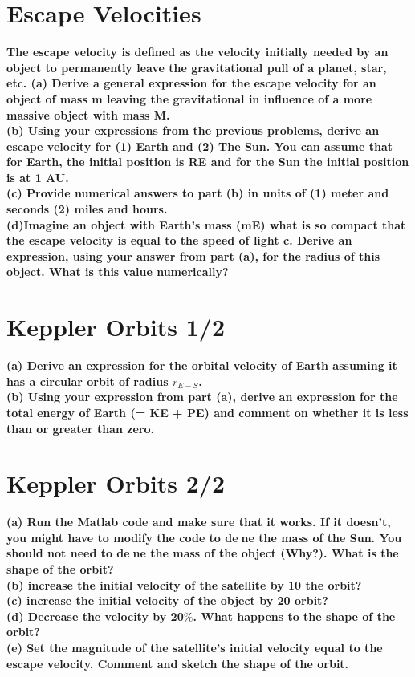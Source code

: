 \documentclass[paper=a4, fontsize=11pt]{scrartcl} %
\numberwithin{equation}{section} %
\numberwithin{figure}{section} %
\numberwithin{table}{section} %
\begin{document}
\section{Escape Velocities}
\textbf{The escape velocity is defined as the velocity initially needed by an object to permanently
leave the gravitational pull of a planet, star, etc.
(a) Derive a general expression for the escape velocity for an object of mass m leaving
the gravitational in
influence of a more massive object with mass M.}\\
\textbf{
(b) Using your expressions from the previous problems, derive an escape velocity for (1)
Earth and (2) The Sun. You can assume that for Earth, the initial position is RE and for
the Sun the initial position is at 1 AU.}\\
\textbf{(c) Provide numerical answers to part (b) in units of (1) meter and seconds (2) miles and
hours.}\\
\textbf{(d)Imagine an object with Earth's mass (mE) what is so compact that the escape velocity
is equal to the speed of light c. Derive an expression, using your answer from part (a), for
the radius of this object. What is this value numerically?}


\section{Keppler Orbits 1/2}
\textbf{(a) Derive an expression for the orbital velocity of Earth assuming it has a circular orbit of
radius $r_{E-S}$.}\\
\textbf{(b) Using your expression from part (a), derive an expression for the total energy of Earth
(= KE + PE) and comment on whether it is less than or greater than zero.}
\section{Keppler Orbits 2/2}

\textbf{(a) Run the Matlab code and make sure that it works. If it doesn't, you might have to
modify the code to dene the mass of the Sun. You should not need to dene the mass of
the object (Why?). What is the shape of the orbit?}\\
\textbf{(b) increase the initial velocity of the satellite by 10%
the orbit?}\\
\textbf{(c) increase the initial velocity of the object by 20%
orbit?}\\
\textbf{(d) Decrease the  velocity by 20$\%$. What happens to the shape of the orbit?}\\
\textbf{(e) Set the magnitude of the satellite's initial velocity equal to the escape velocity. Comment and sketch the shape of the orbit.}
\end{document}
